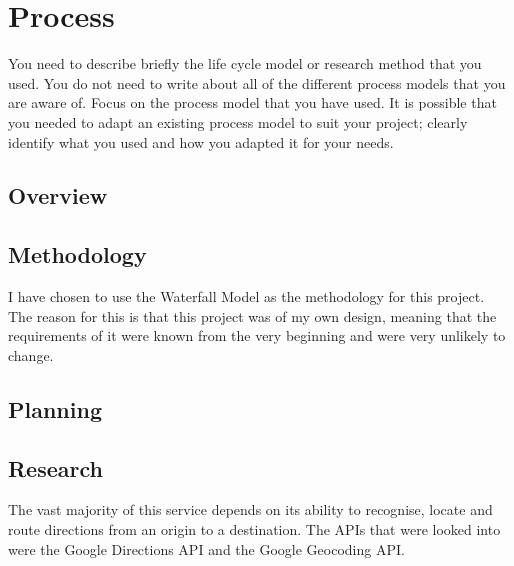 \section{Process}
You need to describe briefly the life cycle model or research method that you used. You do not need to write about all of the different process models that you are aware of. Focus on the process model that you have used. It is possible that you needed to adapt an existing process model to suit your project; clearly identify what you used and how you adapted it for your needs.

\subsection{Overview}
\subsection{Methodology}
I have chosen to use the Waterfall Model as the methodology for this project. The reason for this is that this project was of my own design, meaning that the requirements of it were known from the very beginning and were very unlikely to change. 
\subsection{Planning}
\subsection{Research}
The vast majority of this service depends on its ability to recognise, locate and route directions from an origin to a destination. The APIs that were looked into were the Google Directions API \cite{google_directions_api} and the Google Geocoding API. 
